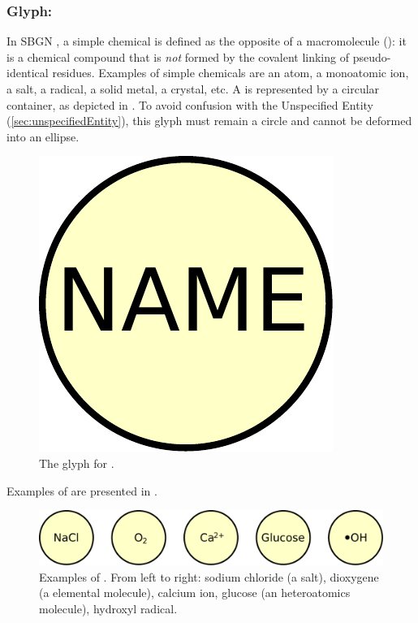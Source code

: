 \subsubsection{Glyph: }
\label{sec:simpleChemical}

In SBGN \PDs, a simple chemical is defined as the opposite of a macromolecule (): it is a chemical compound that is \emph{not} formed by the covalent linking of pseudo-identical residues.  Examples of simple chemicals are an atom, a monoatomic ion, a salt, a radical, a solid metal, a crystal, etc. A  is represented by a circular
container, as depicted in . To avoid confusion with the Unspecified Entity (\ref{sec:unspecifiedEntity}), this glyph must remain a circle and cannot be deformed into an ellipse.

\begin{figure}[htb]
  \centering
  \includegraphics[scale = 0.3]{le_images/simpleChemical}
  \caption{The \PD glyph for .}
  \label{fig:simpleChemical}
\end{figure}

Examples of  are presented in .

\begin{figure}[htb]
  \centering
  \includegraphics[scale = 0.5]{le_images/simpleChemical-examples}
  \caption{Examples of . From left to right: sodium chloride (a salt), dioxygene (a elemental molecule), calcium ion, glucose (an heteroatomics molecule), hydroxyl radical.}
  \label{fig:simpleChemical-examples}
\end{figure}

